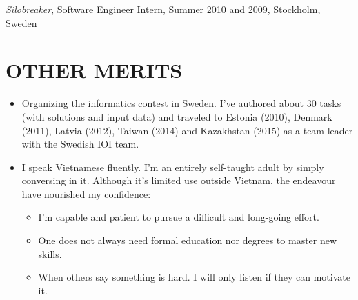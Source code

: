 \documentclass[11pt]{res} %
\begin{document}
\begin{resume}
 \emph{Silobreaker}, {\footnotesize Software Engineer Intern, Summer 2010 and 2009}, Stockholm, Sweden

\section{OTHER MERITS}

\begin{itemize} %
  \item Organizing the informatics contest in Sweden.  I've authored about
    30 tasks (with solutions and input data) and traveled to Estonia (2010),
    Denmark (2011), Latvia (2012), Taiwan (2014) and Kazakhstan (2015) as a
    team leader with the Swedish IOI team.
  \item I speak Vietnamese fluently. I'm an entirely self-taught adult by simply
    conversing in it.  Although it's limited use outside
    Vietnam,  the endeavour have nourished my confidence:
    \begin{itemize}
        \item I'm capable and patient to pursue a difficult and long-going effort.
        \item One does not always need formal education nor degrees to master new skills.
        \item When others say something is hard. I will only listen if they can motivate it.
    \end{itemize}
\end{itemize}

\end{resume}
\end{document}
